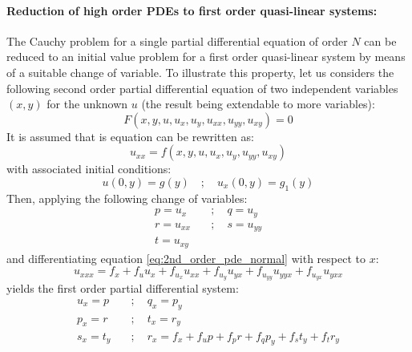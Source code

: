 \paragraph{Reduction of high order PDEs to first order quasi-linear systems:} The Cauchy problem for a single partial differential equation of order $N$ can be reduced to an initial value problem for a first order quasi-linear system by means of a suitable change of variable. To illustrate this property, let us considers the following second order partial differential equation of two independent variables $(x,y)$ for the unknown $u$ (the result being extendable to more variables):
\begin{equation}
  \label{eq:2nd_order_pde}
  F(x,y,u,u_x,u_y,u_{xx},u_{yy},u_{xy})=0
\end{equation}
It is assumed that is equation can be rewritten as:
\begin{equation}
  \label{eq:2nd_order_pde_normal}
  u_{xx}= f(x,y,u,u_x,u_y,u_{yy},u_{xy})
\end{equation}
with associated initial conditions:
\begin{equation}
  \label{eq:2nd_order_pde_ICs}
  u(0,y)= g(y) \quad ; \quad u_x(0,y)= g_1(y)
\end{equation}
Then, applying the following change of variables:
\begin{equation*}
  \label{eq:change_of_variables}
  \begin{aligned}
     p = u_x \quad & ; \quad   q = u_{y} \\
     r = u_{xx} \quad  & ; \quad  s = u_{yy}\\
     t = u_{xy} \quad &
  \end{aligned}
\end{equation*}
and differentiating equation \eqref{eq:2nd_order_pde_normal} with respect to $x$:
\begin{equation*}
  \label{eq:r_x}
  u_{xxx}= f_x + f_u u_x + f_{u_x}u_{xx} + f_{u_y}u_{yx} + f_{u_{yy}}u_{yyx}+f_{u_{yx}}u_{yxx}
\end{equation*}
yields the first order partial differential system:
\begin{equation}
  \label{eq:1st_order_quasilinear_system}
  \begin{aligned}
    u_x  = p \quad & ; \quad    q_x  = p_y \\
    p_x  = r \quad &;\quad     t_x  = r_y \\
    s_x  = t_y \quad &;\quad   r_x  = f_x + f_up + f_p r + f_q p_y + f_s t_y + f_t r_y
  \end{aligned}
\end{equation}
